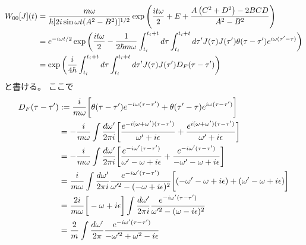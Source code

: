 \begin{align}
    W_{00}[J](t)
    &=
    \dfrac{m \omega}{
        \hbar
        [
            2 i \sin \omega t 
            (A^2 - B^2)
        ]^{1 / 2}
    }
    \exp\left(
        \dfrac{i t \omega}{2}
        +
        E
        +
        \dfrac{
            A
            \left(
                C^2 + D^2
            \right)
        -
            2 BCD
        }{
            A^2 - B^2
        }
    \right)
\notag\\&
    =
    e^{ - i \omega t / 2 }
    \exp\bigg(
        \dfrac{i t \omega}{2}
        -
        \dfrac{1}{2 \hbar m \omega}
        \int_{t_i}^{t_i + t}
            d\tau
        \int_{t_i}^{t_i + t}
            d\tau'
        J(\tau) J(\tau')
        \theta(\tau - \tau')
            e^{ i \omega (\tau' - \tau) }
    \bigg)
\notag\\&
    =
    \exp\bigg(
        \dfrac{i}{4 \hbar}
        \int_{t_i}^{t_i + t}
            d\tau
        \int_{t_i}^{t_i + t}
            d\tau'
        J(\tau) J(\tau')
            D_F (\tau - \tau')
    \bigg)
\end{align}
と書ける。
ここで
\begin{align}
    D_F (\tau - \tau')
    &:=
    \dfrac{ i }{m \omega}
    \bigg[
        \theta(\tau - \tau')
        e^{ - i \omega (\tau - \tau') }
    +
        \theta(\tau' - \tau)
        e^{ i \omega (\tau - \tau') }
    \bigg]
\notag\\&=
    -
    \dfrac{ i }{m \omega}
    \int
        \dfrac{d \omega'}{2 \pi i}
    \bigg[
        \dfrac{
            e^{ - i (\omega + \omega') (\tau - \tau') }
        }{\omega' + i \epsilon}
    +
        \dfrac{
            e^{ i (\omega + \omega') (\tau - \tau') }
        }{\omega' + i \epsilon}
    \bigg]
\notag\\&=
    -
    \dfrac{ i }{m \omega}
    \int
        \dfrac{d \omega'}{2 \pi i}
    \bigg[
        \dfrac{
            e^{ - i \omega' (\tau - \tau') }
        }{\omega' - \omega + i \epsilon}
    +
        \dfrac{
            e^{ - i \omega' (\tau - \tau') }
        }{- \omega' - \omega + i \epsilon}
    \bigg]
\notag\\&=
    \dfrac{ i }{m \omega}
    \int
        \dfrac{d \omega'}{2 \pi i}
        \dfrac{
            e^{ - i \omega' (\tau - \tau') }
        }{\omega'^2 - (- \omega + i \epsilon)^2}
    \bigg[
        (- \omega' - \omega + i \epsilon)
    +
        (\omega' - \omega + i \epsilon)
    \bigg]
\notag\\&=
    \dfrac{ 2 i }{m \omega}
    \bigg[
        - \omega + i \epsilon
    \bigg]
    \int
        \dfrac{d \omega'}{2 \pi i}
        \dfrac{
            e^{ - i \omega' (\tau - \tau') }
        }{\omega'^2 - (\omega - i \epsilon)^2}
\notag\\&=
    \dfrac{2}{m}
    \int
        \dfrac{d \omega'}{2 \pi}
        \dfrac{
            e^{ - i \omega' (\tau - \tau') }
        }{- \omega'^2 + \omega^2 - i \epsilon}
\end{align}
